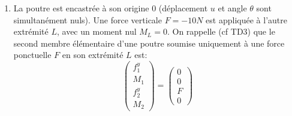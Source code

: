\documentclass[11pt]{article}
\begin{document}
\begin{enumerate}
\[\begin{array}{r}
\end{array}\right)=\left(\begin{array}{r} 
\frac{pL}{2}\\\frac{pL^2}{12}\\\frac{pL}{2}\\-\frac{pL^2}{12}
\end{array}\right)\]
 \item La poutre est encastrée à son origine $0$ (déplacement $u$ et angle $\theta$ sont simultanément nuls). Une force verticale $F=-10N$ est appliquée à l'autre extrémité $L$, avec un moment nul $M_L=0$.
 On rappelle (cf TD3)  que le second membre élémentaire d'une poutre soumise uniquement à une force ponctuelle $F$  en son extrémité $L$  est:
\[\left(\begin{array}{r} 
f_{1}^y\\M_1\\f_{2}^y\\M_2
\end{array}\right)=\left(\begin{array}{r} 
0\\0\\F\\0
\end{array}\right)\]

 


\end{enumerate}
\end{document}
